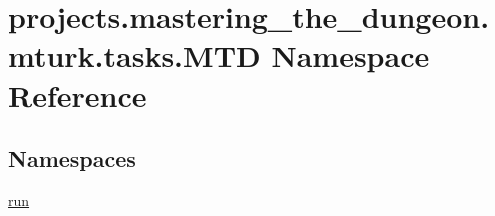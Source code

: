 \hypertarget{namespaceprojects_1_1mastering__the__dungeon_1_1mturk_1_1tasks_1_1MTD}{}\section{projects.\+mastering\+\_\+the\+\_\+dungeon.\+mturk.\+tasks.\+M\+TD Namespace Reference}
\label{namespaceprojects_1_1mastering__the__dungeon_1_1mturk_1_1tasks_1_1MTD}
\subsection*{Namespaces}
\begin{DoxyCompactItemize}
\item 
 \hyperlink{namespaceprojects_1_1mastering__the__dungeon_1_1mturk_1_1tasks_1_1MTD_1_1run}{run}
\end{DoxyCompactItemize}
